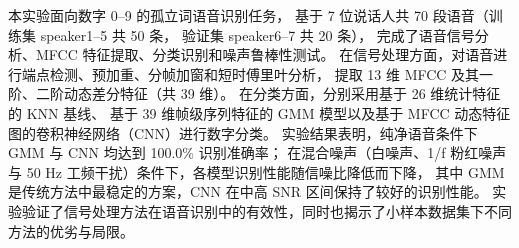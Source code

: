 本实验面向数字 0--9 的孤立词语音识别任务，
基于 7 位说话人共 70 段语音（训练集 speaker1--5 共 50 条，
验证集 speaker6--7 共 20 条），
完成了语音信号分析、MFCC 特征提取、分类识别和噪声鲁棒性测试。
在信号处理方面，对语音进行端点检测、预加重、分帧加窗和短时傅里叶分析，
提取 13 维 MFCC 及其一阶、二阶动态差分特征（共 39 维）。
在分类方面，分别采用基于 26 维统计特征的 KNN 基线、
基于 39 维帧级序列特征的 GMM 模型以及基于 MFCC 动态特征图的卷积神经网络（CNN）进行数字分类。
实验结果表明，纯净语音条件下 GMM 与 CNN 均达到 100.0\% 识别准确率；
在混合噪声（白噪声、1/f 粉红噪声与 50 Hz 工频干扰）条件下，各模型识别性能随信噪比降低而下降，
其中 GMM 是传统方法中最稳定的方案，CNN 在中高 SNR 区间保持了较好的识别性能。
实验验证了信号处理方法在语音识别中的有效性，同时也揭示了小样本数据集下不同方法的优劣与局限。